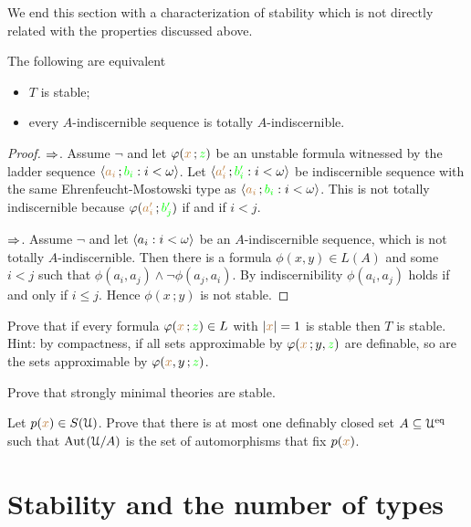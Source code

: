 \documentclass[creche.tex]{subfiles}
\begin{document}
We end this section with a characterization of stability which is not directly related with the properties discussed above. 

\begin{proposition} The following are equivalent
\begin{itemize}
\item[1.] $T$ is stable;
\item[2.] every $A$-indiscernible sequence is totally $A$-indiscernible.
\end{itemize}
\end{proposition}

\begin{proof}
$\Rightarrow$. Assume $\neg$ and let $\varphi({\color{brown} x}\,;{\color{green} z})$ be an unstable formula witnessed by the ladder sequence $\langle{\color{brown}a_i}\,;{\color{green} b_i}:i<\omega\rangle$. Let $\langle{\color{brown}a'_i}\,;{\color{green} b'_i} : i<\omega\rangle$ be 
indiscernible sequence with the same Ehren\-feucht-Mostowski type as $\langle{\color{brown}a_i}\,;{\color{green} b_i} : i<\omega\rangle$. This is not totally indiscernible because $\varphi({\color{brown} a'_i}\,;{\color{green} b'_j})$ if and if $i< j$.

$\Rightarrow$. Assume $\neg$ and let $\langle a_i : i<\omega\rangle$ be an $A$-indiscernible sequence, which is not totally $A$-in\-dis\-cern\-ible. Then there is a formula $\phi(x, y)\in L(A)$ and some $i<j$ such that $\phi(a_i , a_j )\wedge\neg\phi(a_j , a_i) $. By indiscernibility  $\phi(a_i, a_j)$ holds if and only if $i\le j$. Hence $\phi(x\,; y)$ is not stable.
\end{proof}

\begin{exercise}
Prove that if every formula $\varphi({\color{brown} x}\,;{\color{green} z})\in L$ with $|{\color{brown} x}|=1$ is stable then $T$ is stable. Hint: by compactness, if all sets approximable by $\varphi({\color{brown} x}\,;y,{\color{green} z})$ are definable, so are the sets approximable by $\varphi({\color{brown} x},y\,;{\color{green} z})$.\QED
\end{exercise}


\begin{exercise}
Prove that strongly minimal theories are stable.\QED
\end{exercise}


\begin{exercise}\label{ex_Cb}
Let $p({\color{brown} x})\in S(\EuScript U)$. Prove that there is at most one definably closed set $A\subseteq\EuScript U^{{\rm eq}}$ such that ${\rm Aut\kern.15ex}(\EuScript U/A)$ is the set of automorphisms that fix $p({\color{brown} x})$.\QED
\end{exercise}

\section{Stability and the number of types}
\end{document}

